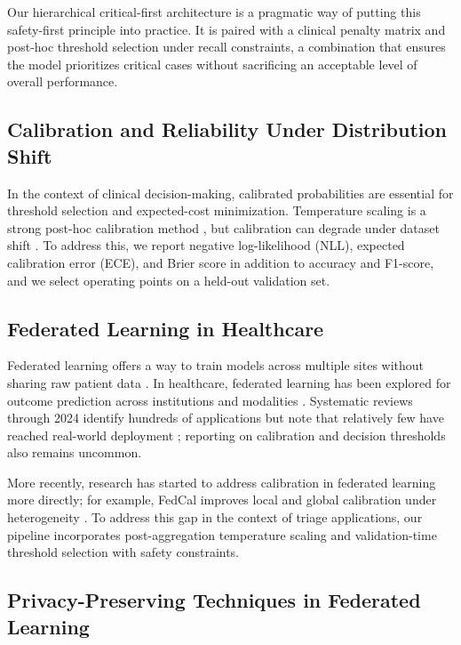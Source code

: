 \documentclass[journal,article,submit,pdftex,moreauthors]{Definitions/mdpi}
\begin{document}
Our hierarchical critical-first architecture is a pragmatic way of putting this safety-first principle into practice. It is paired with a clinical penalty matrix and post-hoc threshold selection under recall constraints, a combination that ensures the model prioritizes critical cases without sacrificing an acceptable level of overall performance.

\subsection{Calibration and Reliability Under Distribution Shift}

In the context of clinical decision-making, calibrated probabilities are essential for threshold selection and expected-cost minimization. Temperature scaling is a strong post-hoc calibration method \cite{guo2017}, but calibration can degrade under dataset shift \cite{ovadia2019,yu2022_mdt}. To address this, we report negative log-likelihood (NLL), expected calibration error (ECE), and Brier score in addition to accuracy and F1-score, and we select operating points on a held-out validation set.

\subsection{Federated Learning in Healthcare}

Federated learning offers a way to train models across multiple sites without sharing raw patient data \cite{mcmahan2017,kairouz2021}. In healthcare, federated learning has been explored for outcome prediction across institutions and modalities \cite{rieke2020,sheller2020,dayan2021}. Systematic reviews through 2024 identify hundreds of applications but note that relatively few have reached real-world deployment \cite{teo2024_fl_survey}; reporting on calibration and decision thresholds also remains uncommon.

More recently, research has started to address calibration in federated learning more directly; for example, FedCal improves local and global calibration under heterogeneity \cite{peng2024_fedcal}. To address this gap in the context of triage applications, our pipeline incorporates post-aggregation temperature scaling and validation-time threshold selection with safety constraints.

\subsection{Privacy-Preserving Techniques in Federated Learning}
\end{document}
